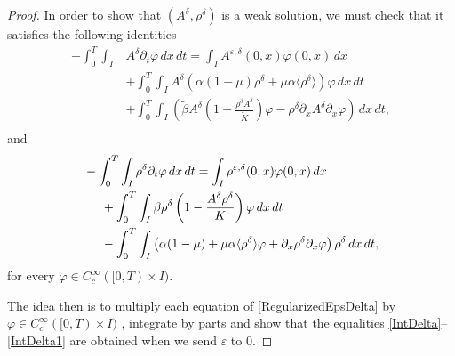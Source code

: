 \documentclass[12pt]{amsart}
\newcommand{\rhoed}{\rho^{\varepsilon,\delta}}
\newcommand{\Aed}{A^{\varepsilon,\delta}}
\newcommand{\D}{\,d}
\begin{document}
\begin{proof}
     	In order to show that $(A^\delta,\rho^\delta)$ is a weak solution, we must check that it satisfies the following identities
\begin{equation}\label{IntDelta}
	\begin{split}
		-\int_{0}^T\int_{I}&A^\delta\partial_t \varphi \D x \D t = \int_{I}\Aed (0,x)\varphi (0,x)\D x \\ &+\int_{0}^T\int_{I} A^\delta\left(\alpha(1-\mu)\rho^\delta+\mu\alpha \langle \rho^\delta \rangle \right) \varphi \D x \D t  \\
		& +\int_{0}^T\int_{I} \left(\widetilde{\beta}A^\delta \left(1-\frac{\rho^\delta A^\delta}{\widetilde{K}}\right) \varphi -\rho^\delta\partial_{x}A^\delta\partial_{x}\varphi \right) \D x \D t,\\
		\end{split}
       \end{equation}
       and
       \begin{equation}\label{IntDelta1}
       \begin{split}
		&-\int_{0}^T\int_{I}\rho^\delta\partial_t\varphi \D x  \D t = \int_{I}\rhoed (0,x) \varphi (0,x) \D x
        \\&\hspace{0.5cm}+\int_{0}^T\int_{I}\beta \rho^\delta  \left(1-\frac{A^\delta\rho^\delta}{K} \right)\varphi \D x \D t \\
		&\hspace{0.5cm}-\int_{0}^T\int_{I}\left(\alpha(1-\mu)+\mu\alpha \langle \rho^\delta\rangle\varphi +\partial_{x}\rho^\delta\partial_{x}\varphi \right)\rho^\delta \D x \D t,\\
        \end{split}
        \end{equation}
for every $\varphi\in C^\infty_c([0,T)\times I)$.

The idea then is to  multiply each equation of \eqref{RegularizedEpsDelta} by $\varphi\in C^\infty_c([0,T)\times I)$ , integrate by parts and  show that the equalities \eqref{IntDelta}--\eqref{IntDelta1} are obtained when we send $\varepsilon$ to $0$.


\end{proof}
\end{document}
